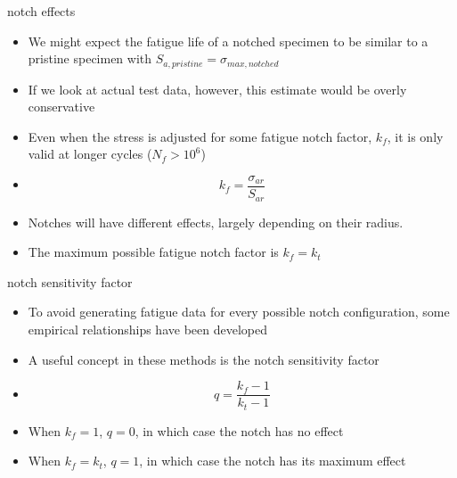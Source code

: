 \documentclass[10pt]{beamer}
\begin{document}
\begin{frame}{notch effects}
	\begin{itemize}[<+->]
		\item We might expect the fatigue life of a notched specimen to be similar to a pristine specimen with $S_{a,pristine} = \sigma_{max,notched}$
		\item If we look at actual test data, however, this estimate would be overly conservative
		\item Even when the stress is adjusted for some fatigue notch factor, $k_f$, it is only valid at longer cycles ($N_f > 10^6$)
		\item[] \begin{equation}
		k_f = \frac{\sigma_{ar}}{S_{ar}}
		\end{equation}
		\item Notches will have different effects, largely depending on their radius.
		\item The maximum possible fatigue notch factor is $k_f = k_t$
	\end{itemize}
\end{frame}

\begin{frame}{notch sensitivity factor}
	\begin{itemize}[<+->]
		\item To avoid generating fatigue data for every possible notch configuration, some empirical relationships have been developed
		\item A useful concept in these methods is the notch sensitivity factor
		\item[] \begin{equation}
		q = \frac{k_f - 1}{k_t -1}
		\end{equation}
		\item When $k_f = 1$, $q=0$, in which case the notch has no effect
		\item When $k_f = k_t$, $q=1$, in which case the notch has its maximum effect
	\end{itemize}
\end{frame}
\end{document}
